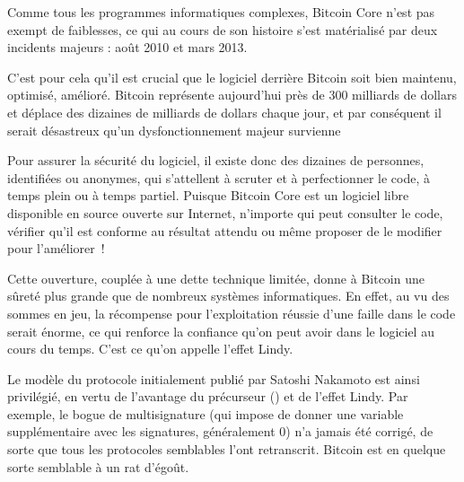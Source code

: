 Comme tous les programmes informatiques complexes, Bitcoin Core n'est pas exempt de faiblesses, ce qui au cours de son histoire s'est matérialisé par deux incidents majeurs : août 2010 et mars 2013.

C'est pour cela qu'il est crucial que le logiciel derrière Bitcoin soit bien maintenu, optimisé, amélioré. Bitcoin représente aujourd'hui près de 300 milliards de dollars et déplace des dizaines de milliards de dollars chaque jour, et par conséquent il serait désastreux qu'un dysfonctionnement majeur survienne

Pour assurer la sécurité du logiciel, il existe donc des dizaines de personnes, identifiées ou anonymes, qui s'attellent à scruter et à perfectionner le code, à temps plein ou à temps partiel. Puisque Bitcoin Core est un logiciel libre disponible en source ouverte sur Internet, n'importe qui peut consulter le code, vérifier qu'il est conforme au résultat attendu ou même proposer de le modifier pour l'améliorer~!

Cette ouverture, couplée à une dette technique limitée, donne à Bitcoin une sûreté plus grande que de nombreux systèmes informatiques. En effet, au vu des sommes en jeu, la récompense pour l'exploitation réussie d'une faille dans le code serait énorme, ce qui renforce la confiance qu'on peut avoir dans le logiciel au cours du temps. C'est ce qu'on appelle l'effet Lindy. %

Le modèle du protocole initialement publié par Satoshi Nakamoto est ainsi privilégié, en vertu de l'avantage du précurseur () et de l'effet Lindy. Par exemple, le bogue de multisignature (qui impose de donner une variable supplémentaire avec les signatures, généralement 0) n'a jamais été corrigé, de sorte que tous les protocoles semblables l'ont retranscrit. Bitcoin est en quelque sorte semblable à un rat d'égoût.

